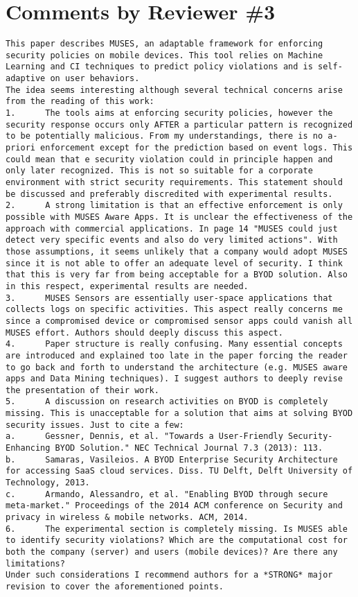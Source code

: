 \documentclass[preprint]{elsarticle}
\begin{document}
\section{Comments by Reviewer \#3}

\begin{verbatim}
This paper describes MUSES, an adaptable framework for enforcing security policies on mobile devices. This tool relies on Machine Learning and CI techniques to predict policy violations and is self-adaptive on user behaviors.
The idea seems interesting although several technical concerns arise from the reading of this work:
1.      The tools aims at enforcing security policies, however the security response occurs only AFTER a particular pattern is recognized to be potentially malicious. From my understandings, there is no a-priori enforcement except for the prediction based on event logs. This could mean that e security violation could in principle happen and only later recognized. This is not so suitable for a corporate environment with strict security requirements. This statement should be discussed and preferably discredited with experimental results.
2.      A strong limitation is that an effective enforcement is only possible with MUSES Aware Apps. It is unclear the effectiveness of the approach with commercial applications. In page 14 "MUSES could just detect very specific events and also do very limited actions". With those assumptions, it seems unlikely that a company would adopt MUSES since it is not able to offer an adequate level of security. I think that this is very far from being acceptable for a BYOD solution. Also in this respect, experimental results are needed.
3.      MUSES Sensors are essentially user-space applications that collects logs on specific activities. This aspect really concerns me since a compromised device or compromised sensor apps could vanish all MUSES effort. Authors should deeply discuss this aspect.
4.      Paper structure is really confusing. Many essential concepts are introduced and explained too late in the paper forcing the reader to go back and forth to understand the architecture (e.g. MUSES aware apps and Data Mining techniques). I suggest authors to deeply revise the presentation of their work.
5.      A discussion on research activities on BYOD is completely missing. This is unacceptable for a solution that aims at solving BYOD security issues. Just to cite a few:
a.      Gessner, Dennis, et al. "Towards a User-Friendly Security-Enhancing BYOD Solution." NEC Technical Journal 7.3 (2013): 113.
b.      Samaras, Vasileios. A BYOD Enterprise Security Architecture for accessing SaaS cloud services. Diss. TU Delft, Delft University of Technology, 2013.
c.      Armando, Alessandro, et al. "Enabling BYOD through secure meta-market." Proceedings of the 2014 ACM conference on Security and privacy in wireless & mobile networks. ACM, 2014.
6.      The experimental section is completely missing. Is MUSES able to identify security violations? Which are the computational cost for both the company (server) and users (mobile devices)? Are there any limitations?
Under such considerations I recommend authors for a *STRONG* major revision to cover the aforementioned points.


\end{verbatim}
\end{document}
